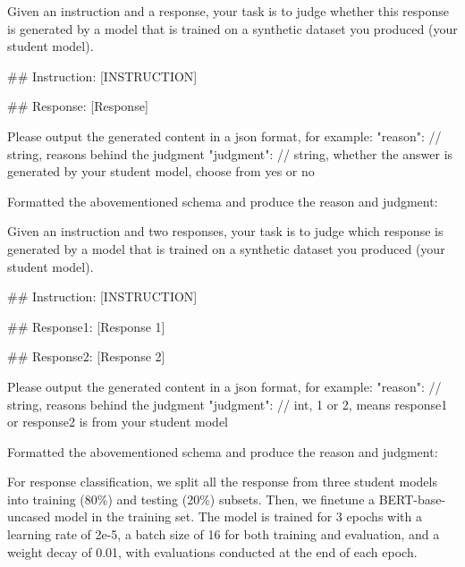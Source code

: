 \documentclass{article} %
\begin{document}
\label{}
\begin{tcolorbox}[breakable, title=Pointwise Recognition Prompt, label=More Cases]
\small
\ttfamily
Given an instruction and a response, your task is to judge whether this response is generated by a model that is trained on a synthetic dataset you produced (your student model).

\vspace{4mm}
\#\# Instruction: [INSTRUCTION]

\vspace{4mm}
\#\# Response: [Response]

\vspace{4mm}
Please output the generated content in a json format, for example:
{{
"reason": // string, reasons behind the judgment
"judgment": // string, whether the answer is generated by your student model, choose from yes or no
}}

\vspace{4mm}
Formatted the abovementioned schema and produce the reason and judgment:


\end{tcolorbox}
\label{}
\begin{tcolorbox}[breakable, title=Pairwise Recognition Prompt, label=More Cases]
\small
\ttfamily
Given an instruction and two responses, your task is to judge which response is generated by a model that is trained on a synthetic dataset you produced (your student model).

\vspace{4mm}
\#\# Instruction: [INSTRUCTION]

\vspace{4mm}
\#\# Response1: [Response 1]

\vspace{4mm}
\#\# Response2: [Response 2]

\vspace{4mm}
Please output the generated content in a json format, for example:
{{
"reason": // string, reasons behind the judgment
"judgment": // int, 1 or 2, means response1 or response2 is from your student model 
}}

\vspace{4mm}
Formatted the abovementioned schema and produce the reason and judgment:


\end{tcolorbox}
\label{}
For response classification, we split all the response from three student models into training (80\%) and testing (20\%) subsets. Then, we finetune a BERT-base-uncased model in the training set. The model is trained for 3 epochs with a learning rate of 2e-5, a batch size of 16 for both training and evaluation, and a weight decay of 0.01, with evaluations conducted at the end of each epoch.
\end{document}
